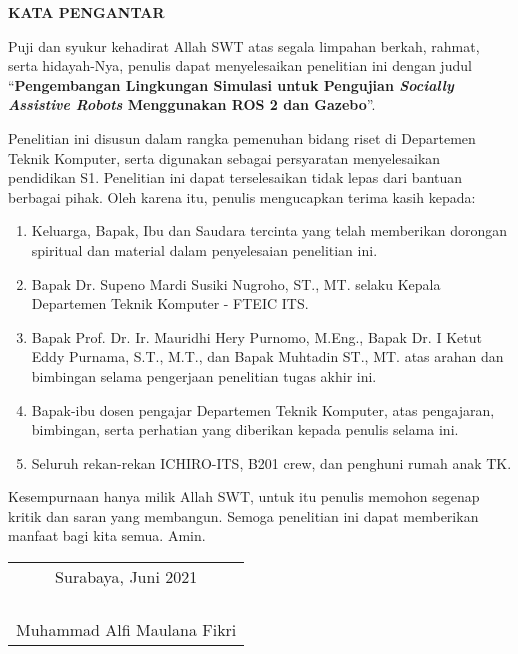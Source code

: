 \begin{center}
  \Large
  \textbf{KATA PENGANTAR}
\end{center}


\vspace{2ex}

Puji dan syukur kehadirat Allah SWT atas segala limpahan berkah, rahmat, serta hidayah-Nya, penulis  dapat menyelesaikan penelitian ini dengan judul
``\textbf{Pengembangan Lingkungan Simulasi untuk Pengujian \emph{Socially Assistive Robots} Menggunakan ROS 2 dan Gazebo}''.

Penelitian ini disusun dalam rangka pemenuhan bidang riset di Departemen Teknik Komputer, serta digunakan sebagai persyaratan menyelesaikan pendidikan  S1.
Penelitian ini dapat terselesaikan tidak lepas dari bantuan berbagai pihak.
Oleh karena itu, penulis mengucapkan terima kasih kepada:

\begin{enumerate}[nolistsep]

  \item Keluarga, Bapak, Ibu dan Saudara tercinta yang telah memberikan dorongan spiritual dan material dalam penyelesaian penelitian ini.

  \item Bapak Dr. Supeno Mardi Susiki Nugroho, ST., MT. selaku Kepala Departemen Teknik Komputer - FTEIC ITS.

  \item Bapak Prof. Dr. Ir. Mauridhi Hery Purnomo, M.Eng., Bapak Dr. I Ketut Eddy Purnama, S.T., M.T., dan Bapak Muhtadin ST., MT. atas arahan dan bimbingan selama pengerjaan penelitian tugas akhir ini.

  \item Bapak-ibu dosen pengajar Departemen Teknik Komputer, atas pengajaran,  bimbingan, serta perhatian yang diberikan kepada penulis selama ini.

  \item Seluruh rekan-rekan ICHIRO-ITS, B201 crew, dan penghuni rumah anak TK.

\end{enumerate}

Kesempurnaan hanya milik Allah SWT, untuk itu penulis memohon segenap kritik dan saran yang  membangun.
Semoga penelitian ini dapat memberikan manfaat bagi kita semua.
Amin.

\begin{flushright}
  \begin{tabular}[b]{c}
    Surabaya, Juni 2021\\
    \\
    \\
    \\
    \\
    Muhammad Alfi Maulana Fikri
  \end{tabular}
\end{flushright}
